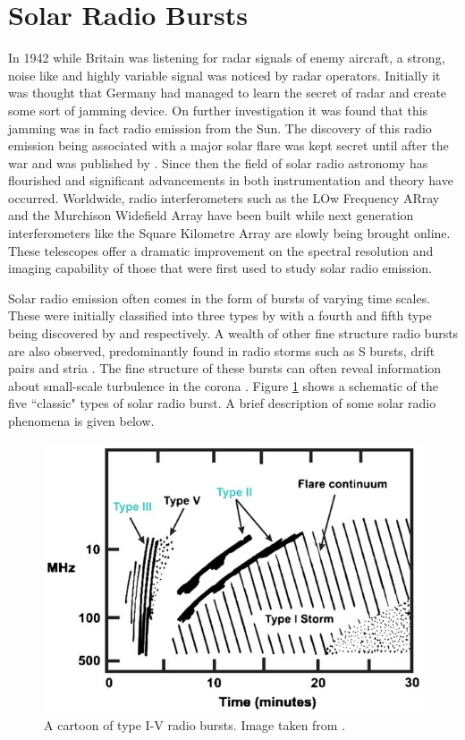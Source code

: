 \section{Solar Radio Bursts}
In 1942 while Britain was listening for radar signals of enemy aircraft, a strong, noise like and highly variable signal was noticed by radar operators. Initially it was thought that Germany had managed to learn the secret of radar and create some sort of jamming device. On further investigation it was found that this jamming was in fact radio emission from the Sun. The discovery of this radio emission being associated with a major solar flare was kept secret until after the war and was published by \cite{Appleton1946}.
Since then the field of solar radio astronomy has flourished and significant advancements in both instrumentation and theory have occurred. Worldwide, radio interferometers such as the LOw Frequency ARray \cite[LOFAR;][]{VanHaarlem2013} and the Murchison Widefield Array \citep[MWA;][]{Lonsdale2009} have been built while next generation interferometers like the Square Kilometre Array \citep[SKA;][]{McMullin2020} are slowly being brought online. These telescopes offer a dramatic improvement on the spectral resolution and imaging capability of those that were first used to study solar radio emission.

Solar radio emission often comes in the form of bursts of varying time scales. These were initially classified into three types by \cite{Wild1950b} with a fourth and fifth type being discovered by \cite{Boischot1957} and \cite{Wild1959} respectively. A wealth of other fine structure radio bursts are also observed, predominantly found in radio storms such as S bursts, drift pairs and stria \citep{McConnell1980,Melrose1982,NelsonandMelrose1985}. 
The fine structure of these bursts can often reveal information about small-scale turbulence in the corona \citep{Reid2021}.
Figure \ref{fig:burst_cartoon} shows a schematic of the five ``classic" types of solar radio burst. A brief description of some solar radio phenomena is given below.
\begin{figure}[ht]
    \centering
    \includegraphics[width=0.75\columnwidth]{Images/Burst_cartoon.jpg}
    \caption[Cartoon of type I-V radio bursts.]{A cartoon of type I-V radio bursts. Image taken from \cite{Cliver2009}.}
    \label{fig:burst_cartoon}
\end{figure}
